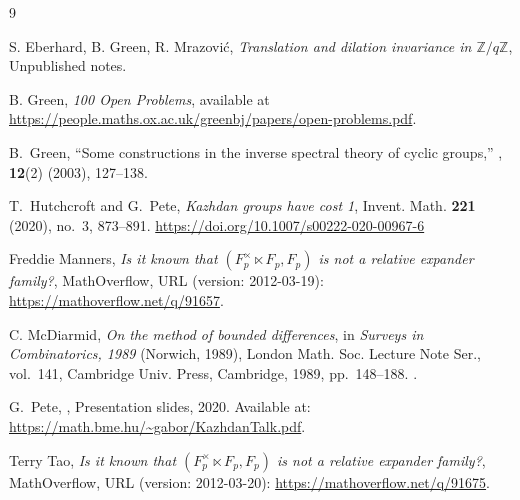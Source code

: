 \documentclass[11pt,letterpaper,reqno]{amsart}
\theoremstyle{definition}
\newcommand{\1}{\mathbf 1}
\begin{document}
\begin{thebibliography}{9}


S. Eberhard, B. Green, R. Mrazovi\'c, \emph{Translation and dilation invariance in $\mathbb{Z}/q\mathbb{Z}$},
Unpublished notes.






B. Green,
\emph{100 Open Problems},
available at \url{https://people.maths.ox.ac.uk/greenbj/papers/open-problems.pdf}.

B.~Green,
\newblock ``Some constructions in the inverse spectral theory of cyclic groups,''
, {\bf 12}(2) (2003), 127--138.


T.~Hutchcroft and G.~Pete,
\emph{Kazhdan groups have cost 1},
Invent. Math. \textbf{221} (2020), no.~3, 873--891.
\url{https://doi.org/10.1007/s00222-020-00967-6}



Freddie Manners, \emph{Is it known that $(F_p^{\times} \ltimes F_p, F_p)$ is not a relative expander family?}, MathOverflow, URL (version: 2012-03-19): \url{https://mathoverflow.net/q/91657}.



C. McDiarmid,
\emph{On the method of bounded differences},
in \emph{Surveys in Combinatorics, 1989} (Norwich, 1989),
London Math. Soc. Lecture Note Ser., vol.~141,
Cambridge Univ. Press, Cambridge, 1989, pp.~148--188.
.



G.~Pete,
,
\newblock Presentation slides, 2020.
\newblock Available at: \url{https://math.bme.hu/~gabor/KazhdanTalk.pdf}.










Terry Tao, \emph{Is it known that $(F_p^{\times} \ltimes F_p, F_p)$ is not a relative expander family?}, MathOverflow, URL (version: 2012-03-20): \url{https://mathoverflow.net/q/91675}.




\end{thebibliography}
\end{document}
